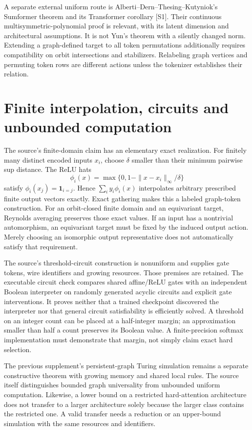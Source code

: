 A separate external uniform route is Alberti--Dern--Thesing--Kutyniok's Sumformer theorem and its Transformer corollary [S1]. Their continuous multisymmetric-polynomial proof is relevant, with its latent dimension and architectural assumptions. It is not Yun's theorem with a silently changed norm. Extending a graph-defined target to all token permutations additionally requires compatibility on orbit intersections and stabilizers. Relabeling graph vertices and permuting token rows are different actions unless the tokenizer establishes their relation.

\section{Finite interpolation, circuits and unbounded computation}

The source's finite-domain claim has an elementary exact realization. For finitely many distinct encoded inputs $x_i$, choose $\delta$ smaller than their minimum pairwise sup distance. The ReLU hats
\[
 \phi_i(x)=\max\{0,1-\|x-x_i\|_\infty/\delta\}
\]
satisfy $\phi_i(x_j)=\mathbf1_{i=j}$. Hence $\sum_i y_i\phi_i(x)$ interpolates arbitrary prescribed finite output vectors exactly. Exact gathering makes this a labeled graph-token construction. For an orbit-closed finite domain and an equivariant target, Reynolds averaging preserves those exact values. If an input has a nontrivial automorphism, an equivariant target must be fixed by the induced output action. Merely choosing an isomorphic output representative does not automatically satisfy that requirement.

The source's threshold-circuit construction is nonuniform and supplies gate tokens, wire identifiers and growing resources. Those premises are retained. The executable circuit check compares shared affine/ReLU gates with an independent Boolean interpreter on randomly generated acyclic circuits and explicit gate interventions. It proves neither that a trained checkpoint discovered the interpreter nor that general circuit satisfiability is efficiently solved. A threshold on an integer count can be placed at a half-integer margin; an approximation smaller than half a count preserves its Boolean value. A finite-precision softmax implementation must demonstrate that margin, not simply claim exact hard selection.

The previous supplement's persistent-graph Turing simulation remains a separate constructive theorem with growing memory and shared local rules. The source itself distinguishes bounded graph universality from unbounded uniform computation. Likewise, a lower bound on a restricted hard-attention architecture does not transfer to a larger architecture solely because the larger class contains the restricted one. A valid transfer needs a reduction or an upper-bound simulation with the same resources and identifiers.

